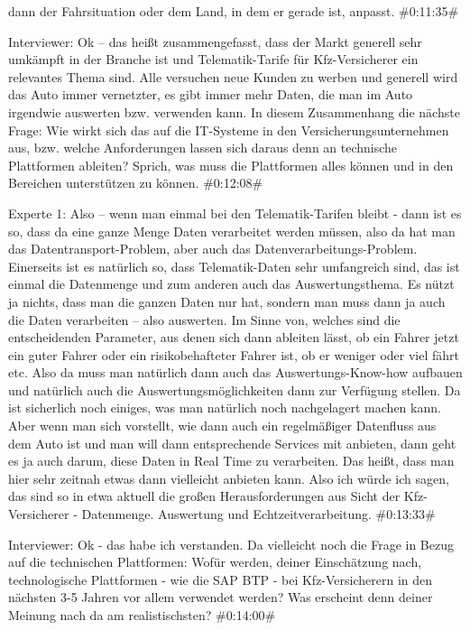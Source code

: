 dann der Fahrsituation oder dem Land, in dem er gerade ist, anpasst.
\#0:11:35\#

Interviewer:
Ok – das heißt zusammengefasst, dass der Markt generell sehr umkämpft in der Branche ist und Telematik-Tarife für Kfz-Versicherer ein relevantes Thema sind. Alle versuchen neue Kunden zu werben und generell wird das Auto immer vernetzter, es gibt immer mehr Daten, die man im Auto irgendwie auswerten bzw. verwenden kann. In diesem Zusammenhang die nächste Frage: Wie wirkt sich das auf die IT-Systeme in den Versicherungsunternehmen aus, bzw. welche Anforderungen lassen sich daraus denn an technische Plattformen ableiten? Sprich, was muss die Plattformen alles können und in den Bereichen unterstützen zu können.
\#0:12:08\#

Experte 1:
Also – wenn man einmal bei den Telematik-Tarifen bleibt - dann ist es so, dass da eine ganze Menge Daten verarbeitet werden müssen, also da hat man das Datentransport-Problem, aber auch das Datenverarbeitungs-Problem. Einerseits ist es natürlich so, dass Telematik-Daten sehr umfangreich sind, das ist einmal die Datenmenge und zum anderen auch das Auswertungsthema. Es nützt ja nichts, dass man die ganzen Daten nur hat, sondern man muss dann ja auch die Daten verarbeiten – also auswerten. Im Sinne von, welches sind die entscheidenden Parameter, aus denen sich dann ableiten lässt, ob ein Fahrer jetzt ein guter Fahrer oder ein risikobehafteter Fahrer ist, ob er weniger oder viel fährt etc. Also da muss man natürlich dann auch das Auswertungs-Know-how aufbauen und natürlich auch die Auswertungsmöglichkeiten dann zur Verfügung stellen. Da ist sicherlich noch einiges, was man natürlich noch nachgelagert machen kann. Aber wenn man sich vorstellt, wie dann auch ein regelmäßiger Datenfluss aus dem Auto ist und man will dann entsprechende Services mit anbieten, dann geht es ja auch darum, diese Daten in Real Time zu verarbeiten. Das heißt, dass man hier sehr zeitnah etwas dann vielleicht anbieten kann. Also ich würde ich sagen, das sind so in etwa aktuell die großen Herausforderungen aus Sicht der Kfz-Versicherer - Datenmenge. Auswertung und Echtzeitverarbeitung.
\#0:13:33\#

Interviewer:
Ok - das habe ich verstanden. Da vielleicht noch die Frage in Bezug auf die technischen Plattformen: Wofür werden, deiner Einschätzung nach, technologische Plattformen - wie die SAP BTP - bei Kfz-Versicherern in den nächsten 3-5 Jahren vor allem verwendet werden? Was erscheint denn deiner Meinung nach da am realistischsten?
\#0:14:00\#

